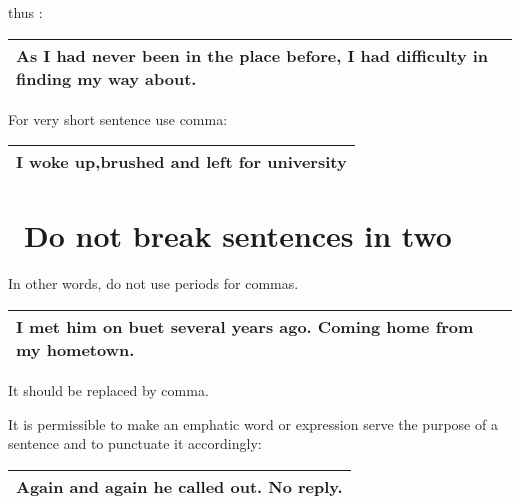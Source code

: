 \documentclass[10pt]{report}
\begin{document}
thus :
 
 
 
 \begin{table}[!tbh]
    \centering
        \begin{tabular}{|l|}
        \hline
    As I had never been in the place before, I had difficulty in
finding my way about.\\
        \hline
        

 \end{tabular}
 \end{table}
 
 For very short sentence use comma:

 
 
 \begin{table}[!tbh]
    \centering
        \begin{tabular}{|l|}
        \hline
        I woke up,brushed and left for university\\
\hline
        

 \end{tabular}
 \end{table}
 
 
 \section {\bfseries \ Do not break sentences in two}
 
 In other words, do not use periods for commas.
 
  \begin{table}[!tbh]
    \centering
        \begin{tabular}{|l|}
        \hline
     I met him on buet several years ago. Coming
home from my hometown.\\
       
\hline
        

 \end{tabular}
 \end{table}
 
 It should be replaced by comma.

\pagebreak

It is permissible to make an emphatic word or expression serve the purpose of a sentence
and to punctuate it accordingly:

\begin{table}[!tbh]
    \centering
        \begin{tabular}{|l|}
        \hline
     Again and again he called out. No reply.\\
        \hline
       
        

 \end{tabular}
 \end{table}
 
\end{document}
